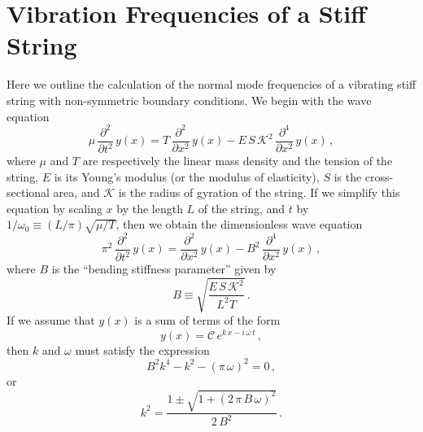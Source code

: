 %
%
%

 \section{Vibration Frequencies of a Stiff String\label{app:freq}}

Here we outline the calculation of the normal mode frequencies of a vibrating stiff string with non-symmetric boundary conditions. We begin with the wave equation~\cite{ref:fletcher1964nvf}
 \begin{equation}
\mu\, \frac{\partial^2}{\partial t^2}\, y(x) = T\, \frac{\partial^2}{\partial x^2}\, y(x) - E\, S\, \mathcal{K}^2\, \frac{\partial^4}{\partial x^2}\, y (x)\, ,
 \end{equation}
where $\mu$ and $T$ are respectively the linear mass density and the tension of the string, $E$ is its Young's modulus (or the modulus of elasticity), $S$ is the cross-sectional area, and $\mathcal{K}$ is the radius of gyration of the string. If we simplify this equation by scaling $x$ by the length $L$ of the string, and $t$ by $1/\omega_0 \equiv  (L/\pi) \sqrt{\mu/T}$, then we obtain the dimensionless wave equation
 \begin{equation} \label{eqn:wave_eqn_dim}
\pi^2\, \frac{\partial^2}{\partial t^2}\, y(x) = \frac{\partial^2}{\partial x^2}\, y(x) - B^2\, \frac{\partial^4}{\partial x^2}\, y (x)\, ,
 \end{equation}
where $B$ is the ``bending stiffness parameter'' given by
 \begin{equation} 
B \equiv \sqrt{\frac{E\, S\, \mathcal{K}^2}{L^2 T}}\, .
 \end{equation}
If we assume that $y(x)$ is a sum of terms of the form
 \begin{equation}
y(x) = \mathcal{C}\, e^{k\, x - i\, \omega\, t}\, ,
 \end{equation}
then $k$ and $\omega$ must satisfy the expression
 \begin{equation}
B^2 k^4 - k^2 - (\pi\, \omega)^2 = 0\, ,
 \end{equation}
or
 \begin{equation}
k^2 = \frac{1 \pm \sqrt{1 + (2\, \pi\, B\, \omega)^2}}{2\, B^2}\, .
 \end{equation}

